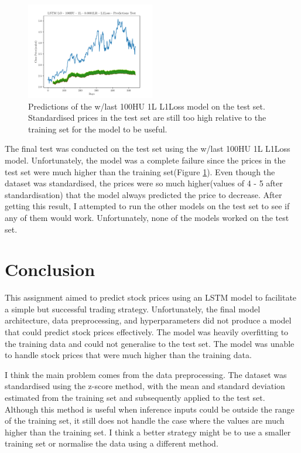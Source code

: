 \begin{figure}[h]
    \centering
    \includegraphics[width=0.5\textwidth, trim=20 0 20 10, clip]{plots/LSTM LO - 100HU - 1L - 0.0001LR - L1Loss-predictions-test.pdf}
    \caption{Predictions of the w/last 100HU 1L L1Loss model on the test set. Standardised prices in the test set are still too high relative to the training set for the model to be useful.}
    \label{fig:test_predtictions}
\end{figure}

The final test was conducted on the test set using the w/last 100HU 1L L1Loss model. Unfortunately, the model was a complete failure since the prices in the test set were much higher than the training set(Figure \ref{fig:test_predtictions}). Even though the dataset was standardised, the prices were so much higher(values of 4 - 5 after standardisation) that the model always predicted the price to decrease. After getting this result, I attempted to run the other models on the test set to see if any of them would work. Unfortunately, none of the models worked on the test set.


\section{Conclusion}

This assignment aimed to predict stock prices using an LSTM model to facilitate a simple but successful trading strategy. Unfortunately, the final model architecture, data preprocessing, and hyperparameters did not produce a model that could predict stock prices effectively. The model was heavily overfitting to the training data and could not generalise to the test set. The model was unable to handle stock prices that were much higher than the training data.

I think the main problem comes from the data preprocessing. The dataset was standardised using the z-score method, with the mean and standard deviation estimated from the training set and subsequently applied to the test set. Although this method is useful when inference inputs could be outside the range of the training set, it still does not handle the case where the values are much higher than the training set. I think a better strategy might be to use a smaller training set or normalise the data using a different method. 

